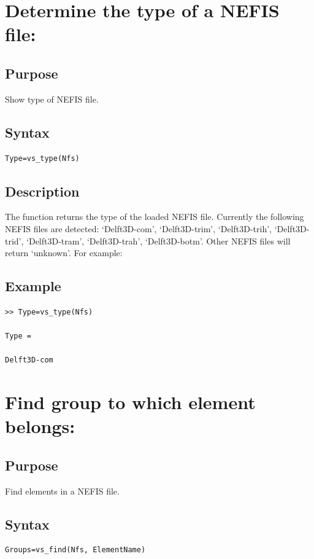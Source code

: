 \section{Determine the type of a NEFIS file: \vstype}

\subsection*{Purpose}
Show type of NEFIS file.

\subsection*{Syntax}
\begin{Verbatim}
Type=vs_type(Nfs)
\end{Verbatim}

\subsection*{Description}
The function returns the type of the loaded NEFIS file.
Currently the following NEFIS files are detected: `Delft3D-com', `Delft3D-trim', `Delft3D-trih', `Delft3D-trid', `Delft3D-tram', `Delft3D-trah', `Delft3D-botm'.
Other NEFIS files will return `unknown'.
For example:

\subsection*{Example}
\begin{Verbatim}
>> Type=vs_type(Nfs)

Type =

Delft3D-com
\end{Verbatim}

\section{Find group to which element belongs: \vsfind}

\subsection*{Purpose}
Find elements in a NEFIS file.

\subsection*{Syntax}
\begin{Verbatim}
Groups=vs_find(Nfs, ElementName)
\end{Verbatim}

